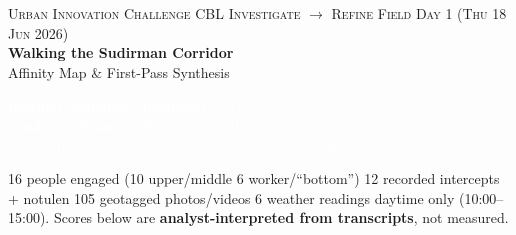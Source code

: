 
\ifdefined\affinityembedded\else
\begin{center}
  {\footnotesize\textsc{Urban Innovation Challenge \textbullet{} CBL Investigate $\rightarrow$ Refine \textbullet{} Field Day 1 (Thu 18 Jun 2026)}}\\[2pt]
  {\LARGE\bfseries Walking the Sudirman Corridor}\\[1pt]
  {\large Affinity Map \& First-Pass Synthesis}
\end{center}
\vspace{2pt}
\fi

\begin{tcolorbox}[colback=ink,colframe=ink,arc=2pt,boxsep=3pt,left=8pt,right=8pt,top=5pt,bottom=5pt]
  \textcolor{white}{\textbf{\textcolor{yellow!80!orange}{Refined challenge (proposed):}}
  Make walking the Sudirman corridor \textbf{comfortable and safe} --- through the heat of the
  day, into the night, and beyond the main trotoar to the streets one block behind it.}
\end{tcolorbox}

{\footnotesize\color{ink!70}16 people engaged (10 upper/middle \textbullet{} 6 worker/``bottom'') \textbullet{}
12 recorded intercepts + notulen \textbullet{} 105 geotagged photos/videos \textbullet{} 6 weather readings
\textbullet{} daytime only (10:00--15:00). Scores below are \textbf{analyst-interpreted from transcripts},
not measured.\par}

